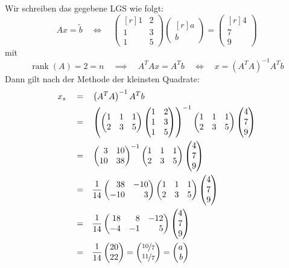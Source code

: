 \documentclass[answers]{exam}
\newcommand{\vektor}[1]{\begin{pmatrix*}[r] #1 \end{pmatrix*}}
\DeclareMathOperator{\rank}{rank}
\begin{document}
\begin{questions}
\begin{solution}
\begin{center}
        \end{center}
        Wir schreiben das gegebene LGS wie folgt:
        $$
            Ax = \tilde{b} \quad \iff \quad \vektor{1 & 2 \\ 1 & 3 \\ 1 & 5}\vektor{a \\ b} = \vektor{4 \\ 7 \\ 9}
        $$
        mit
        $$
            \rank(A) = 2 = n \quad \implies \quad A^TAx = A^Tb \quad \iff \quad x = \left(A^T A\right)^{-1} A^T b
        $$
        Dann gilt nach der Methode der kleinsten Quadrate:
        $$
            \begin{aligned}
                x_s \quad = \quad & \left(A^T A\right)^{-1} A^T b             \\
                = \quad           & \left(\vektor{ 1              & 1   & 1   \\ 2 & 3 & 5} \vektor{1 & 2 \\ 1 & 3 \\ 1 & 5}\right)^{-1} \vektor{1 & 1 & 1 \\ 2                                & 3  & 5 } \vektor{4 \\ 7 \\ 9} \\
                = \quad           & \vektor{3                     & 10        \\ 10 & 38}^{-1} \vektor{1 & 1 & 1 \\ 2                                & 3  & 5 } \vektor{4 \\ 7 \\ 9} \\
                = \quad           & \frac{1}{14}\vektor{38        & -10       \\ -10 & 3} \vektor{1 & 1 & 1 \\ 2                                & 3  & 5 } \vektor{4 \\ 7 \\ 9} \\
                = \quad           & \frac{1}{14} \vektor{18       & 8   & -12 \\ -4 & -1 & 5} \vektor{4 \\ 7 \\ 9} \\
                = \quad           & \frac{1}{14} \vektor{20                   \\ 22} = \vektor{\nicefrac{10}{7} \\ \nicefrac{11}{7}} = \vektor{a \\ b}
            \end{aligned}
        $$


\end{solution}
\end{questions}
\end{document}
